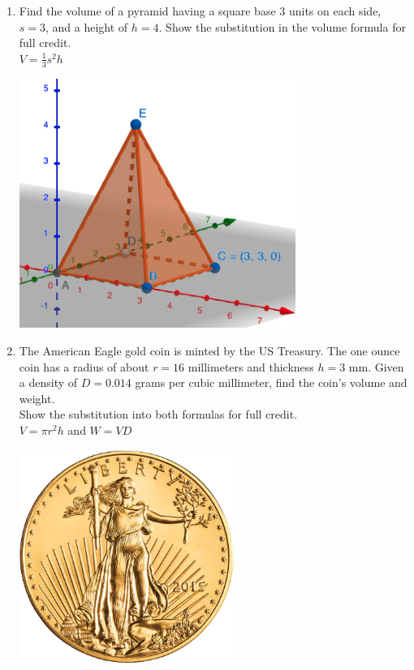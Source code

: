\documentclass[12pt, twoside]{article}
\begin{document}
\begin{enumerate}
\newpage
\item Find the volume of a pyramid having a square base 3 units on each side, $s=3$, and a height of $h=4$. Show the substitution in the volume formula for full credit. \\[0.5cm]
$\displaystyle V = \frac{1}{3} s^2 h$
  \begin{flushright}
    \includegraphics[width=9cm]{6-15-4-pyramid.png}
  \end{flushright}

\newpage
\item The American Eagle gold coin is minted by the US Treasury. The one ounce coin has a radius of about $r=16$ millimeters and thickness $h=3$ mm. Given a density of $D = 0.014$ grams per cubic millimeter, find the coin's volume and weight. \\[0.25cm]
Show the substitution into both formulas for full credit.\\[0.5cm]
$\displaystyle V = \pi r^2 h$ and $W=VD$
  \begin{flushright}
    \includegraphics[width=7cm]{6-15-5-coin.png}
  \end{flushright}
  

\end{enumerate}
\end{document}

